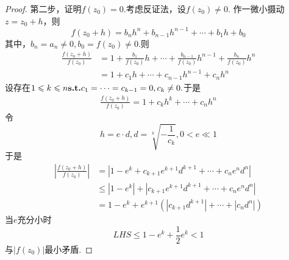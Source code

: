 {\begin{proof}
        第二步，证明$f\left(z_0\right)=0.$考虑反证法，设$f\left(z_0\right)\neq 0.$ 作一微小摄动$z=z_0+h$，则
        \[
            f\left(z_0+h\right)=b_nh^n+b_{n-1}h^{n-1}+\cdots+b_1h+b_0
        \]
        其中，$b_n=a_n\neq 0,b_0=f\left(z_0\right)\neq 0.$则
        \begin{align*}
            \frac{f\left(z_0+h\right)}{f\left(z_0\right)} & =1+\frac{b_1}{f\left(z_0\right)}h+
            \cdots+\frac{b_{n-1}}{f\left(z_0\right)}h^{n-1}+\frac{b_n}{f\left(z_0\right)}h^n     \\
                                                          & =1+c_1h+\cdots+c_{n-1}h^{n-1}+c_nh^n
        \end{align*}
        设存在$1\leqslant k\leqslant n\textup{\bfseries{s.t.}} c_1=\cdots=c_{k-1}=0,c_k\neq 0.
        $于是
        \begin{align*}
            \frac{f\left(z_0+h\right)}{f\left(z_0\right)}=1+c_kh^k+\cdots+c_nh^n
        \end{align*}
        令\[
            h=e\cdot d,d=\sqrt[k]{-\frac{1}{c_k}},0<e\ll 1\]于是
        \begin{align*}
            \left|
            \frac{f\left(z_0+h\right)}{f\left(z_0\right)}\right| & =
            \left|1-e^k+c_{k+1}e^{k+1}d^{k+1}+\cdots+c_ne^nd^n
            \right|
            \\
                                                                 & \leqslant
            \left|1-e^k\right|+\left|c_{k+1}e^{k+1}d^{k+1}+\cdots+c_ne^nd^n
            \right|                                                                                                                                  \\
                                                                 & =1-e^k+e^{k+1}\left(\left|c_{k+1}d^{k+1}\right|+\cdots+\left|c_nd^n\right|\right)
        \end{align*}
        当$e$充分小时\[
            LHS\leqslant 1-e^k+\frac{1}{2}e^k<1\]与$\left|f\left(z_0\right)\right|$最小矛盾.
    \end{proof}
}
